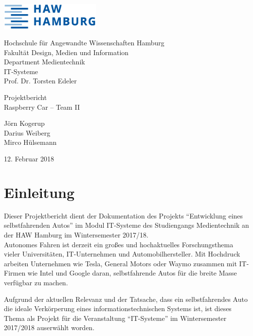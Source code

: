 \documentclass[a4paper, 12pt]{scrartcl}
\begin{document}
	\thispagestyle{empty}
	\begin{flushright}
		\includegraphics[width=5cm]{HAW_Logo.eps}
	\end{flushright}
	Hochschule für Angewandte Wissenschaften Hamburg\\
	Fakultät Design, Medien und Information\\
	Department Medientechnik\\[1ex]
	IT-Systeme\\
	Prof. Dr. Torsten Edeler
	
	\vspace{1cm}
	\begin{center}
		\large{Projektbericht}\\
		\LARGE{Raspberry Car -- Team II}
		
		\vspace{2ex}
		\large{	Jörn Kogerup\\
				Darius Weiberg\\
				Mirco Hülsemann}
		
		\vspace{2ex}
		\large{12. Februar 2018}
		
	\end{center}

\newpage
\tableofcontents
\newpage

\section{Einleitung}

Dieser Projektbericht dient der Dokumentation des Projekts “Entwicklung eines selbstfahrenden Autos” im Modul IT-Systeme des Studiengangs Medientechnik an der HAW Hamburg im Wintersemester 2017/18.\\

Autonomes Fahren ist derzeit ein großes und hochaktuelles Forschungsthema vieler Universitäten, IT-Unternehmen und Automobilhersteller. Mit Hochdruck arbeiten Unternehmen wie Tesla, General Motors oder Waymo zusammen mit IT-Firmen wie Intel und Google daran, selbstfahrende Autos für die breite Masse verfügbar zu machen.

Aufgrund der aktuellen Relevanz und der Tatsache, dass ein selbstfahrendes Auto die ideale Verkörperung eines informationstechnischen Systems ist, ist dieses Thema als Projekt für die Veranstaltung “IT-Systeme” im Wintersemester 2017/2018 auserwählt worden.\\
\end{document}
